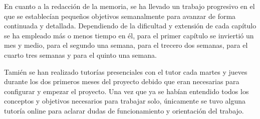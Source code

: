 En cuanto a la redacción de la memoria, se ha llevado un trabajo progresivo en el que se establecían pequeños objetivos semanalmente para avanzar de forma continuada y detallada. Dependiendo de la dificultad y extensión de cada capítulo se ha empleado más o menos tiempo en él, para el primer capítulo se inviertió un mes y medio, para el segundo una semana, para el trecero dos semanas, para el cuarto tres semanas y para el quinto una semana.

Tamién se han realizado tutorías presenciales con el tutor cada martes y jueves durante los dos primeros meses del proyecto debido que eran necesarias para configurar y empezar el proyecto. Una vez que ya se habían entendido todos los conceptos y objetivos necesarios para trabajar solo, únicamente se tuvo alguna tutoría online para aclarar dudas de funcionamiento y orientación del trabajo.

